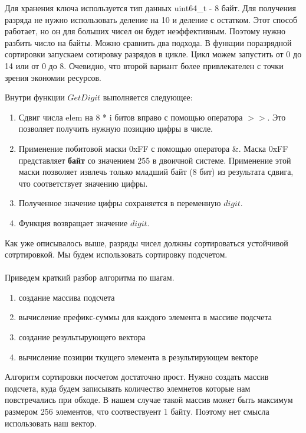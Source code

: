 Для хранения ключа используется тип данных uint64\_t - 8 байт.
Для получения разряда не нужно использовать деление на 10 и деление с остатком. Этот способ работает, 
но он для больших чисел он будет неэффективным. Поэтому нужно разбить число на байты. Можно сравнить два подхода.
В функции поразрядной сортировки запускаем сотировку разрядов в цикле. Цикл можем запустить от 0 до 14 или от 0 до 8.
Очевидно, что второй вариант более привлекателен с точки зрения экономии ресурсов.

Внутри функции $GetDigit$ выполняется следующее:
\begin{enumerate}
	\item Сдвиг числа elem на 8 * i битов вправо с помощью оператора \(>>\). Это позволяет получить нужную позицию цифры в числе.
	\item Применение побитовой маски 0xFF с помощью оператора \&. Маска 0xFF представляет \textbf{байт} со значением 255 в двоичной системе. Применение этой маски позволяет извлечь только младший байт (8 бит) из результата сдвига, что соответствует значению цифры.
	\item Полученное значение цифры сохраняется в переменную $digit$.
	\item Функция возвращает значение $digit$.
\end{enumerate}


Как уже описывалось выше, разряды чисел должны сортироваться устойчивой сотртировкой. Мы будем использовать сортировку подсчетом.\\\\

Приведем краткий разбор алгоритма по шагам.
\begin{enumerate}
	\item создание массива подсчета
	\item вычисление префикс-суммы для каждого элемента в массиве подсчета
	\item создание результырующего вектора
	\item вычисление позиции ткущего элемента в результирующем векторе
\end{enumerate}


Алгоритм сортировки посчетом достаточно прост. Нужно создать массив подсчета, 
куда будем записывать количество элемнетов которые нам повстречались при обходе.
В нашем случае такой массив может быть максимум размером 256 элементов, что соотвествуент 1 байту.
Поэтому нет смысла использовать наш вектор.\\\\

